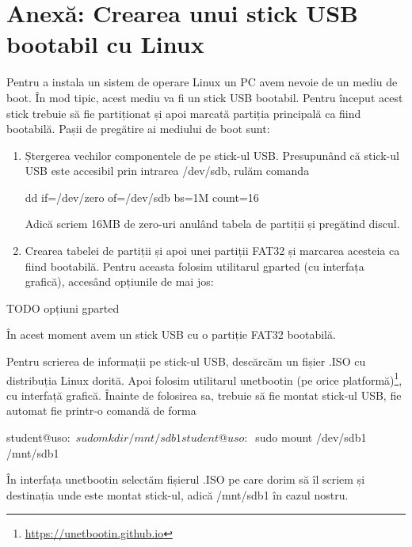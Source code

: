 \section{Anexă: Crearea unui stick USB bootabil cu Linux}
\label{sec:boot-usb}

Pentru a instala un sistem de operare Linux un PC avem nevoie de un mediu de
boot. În mod tipic, acest mediu va fi un stick USB bootabil. Pentru început
acest stick trebuie să fie partiționat și apoi marcată partiția principală ca
fiind bootabilă. Pașii de pregătire ai mediului de boot sunt:

\begin{enumerate}
	\item Ștergerea vechilor componentele de pe stick-ul USB. Presupunând că
		stick-ul USB este accesibil prin intrarea /dev/sdb, rulăm
		comanda

\begin{screen}
dd if=/dev/zero of=/dev/sdb bs=1M count=16
\end{screen}

Adică scriem 16MB de zero-uri anulând tabela de partiții și pregătind discul.

	\item Crearea tabelei de partiții și apoi unei partiții FAT32 și
		marcarea acesteia ca fiind bootabilă. Pentru aceasta folosim
		utilitarul gparted (cu interfața grafică), accesând opțiunile de
		mai jos:

\end{enumerate}

TODO opțiuni gparted

În acest moment avem un stick USB cu o partiție FAT32 bootabilă.

Pentru scrierea de informații pe stick-ul USB, descărcăm un fișier .ISO
 cu distribuția
Linux dorită. Apoi folosim utilitarul unetbootin (pe orice
platformă)\footnote{\url{https://unetbootin.github.io}}, cu interfață grafică.
Înainte de folosirea sa, trebuie să fie montat stick-ul USB, fie automat fie
printr-o comandă de forma

\begin{screen}
student@uso:~$ sudo mkdir /mnt/sdb1
student@uso:~$ sudo mount /dev/sdb1 /mnt/sdb1
\end{screen}

În interfața unetbootin selectăm fișierul .ISO pe care dorim să îl scriem și
destinația unde este montat stick-ul, adică /mnt/sdb1 în cazul nostru.

